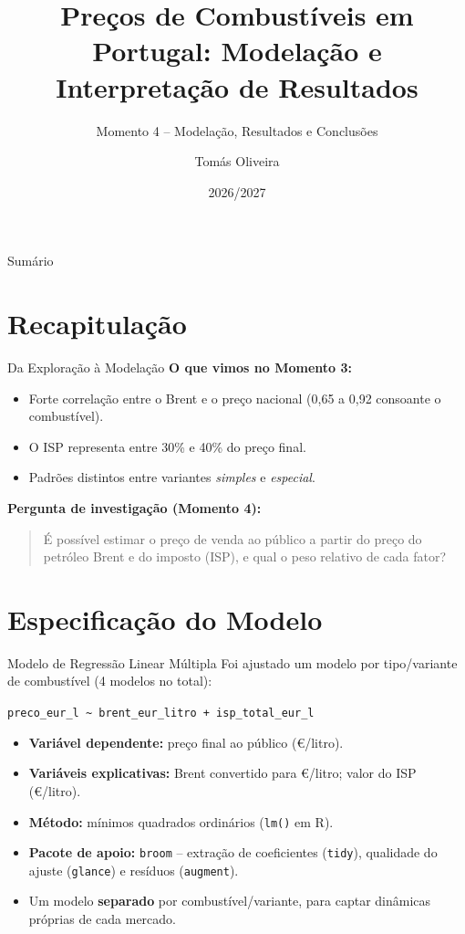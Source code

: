 \documentclass{beamer}
\title[Momento 4: Modelação e Resultados]{Preços de Combustíveis em Portugal: Modelação e Interpretação de Resultados}
\subtitle{Momento 4 -- Modelação, Resultados e Conclusões}
\author{Tomás Oliveira}
\institute[UFP]{Seminário de Sistemas e Aplicações \\ Mestrado em Engenharia Informática -- UFP}
\date{2026/2027}
\begin{document}
\begin{frame}
  \titlepage
\end{frame}

\begin{frame}{Sumário}
  \tableofcontents
\end{frame}

\section{Recapitulação}
\begin{frame}{Da Exploração à Modelação}
  \textbf{O que vimos no Momento 3:}
  \begin{itemize}
    \item Forte correlação entre o Brent e o preço nacional (0,65 a 0,92 consoante o combustível).
    \item O ISP representa entre 30\% e 40\% do preço final.
    \item Padrões distintos entre variantes \emph{simples} e \emph{especial}.
  \end{itemize}
  \vspace{0.4cm}
  \textbf{Pergunta de investigação (Momento 4):}
  \begin{quote}
    É possível estimar o preço de venda ao público a partir do preço do petróleo Brent e do imposto (ISP), e qual o peso relativo de cada fator?
  \end{quote}
\end{frame}

\section{Especificação do Modelo}
\begin{frame}{Modelo de Regressão Linear Múltipla}
  Foi ajustado um modelo por tipo/variante de combustível (4 modelos no total):
  \vspace{0.2cm}
  \begin{center}
    \texttt{preco\_eur\_l \textasciitilde\ brent\_eur\_litro + isp\_total\_eur\_l}
  \end{center}
  \vspace{0.3cm}
  \begin{itemize}
    \item \textbf{Variável dependente:} preço final ao público (€/litro).
    \item \textbf{Variáveis explicativas:} Brent convertido para €/litro; valor do ISP (€/litro).
    \item \textbf{Método:} mínimos quadrados ordinários (\texttt{lm()} em R).
    \item \textbf{Pacote de apoio:} \texttt{broom} -- extração de coeficientes (\texttt{tidy}), qualidade do ajuste (\texttt{glance}) e resíduos (\texttt{augment}).
    \item Um modelo \textbf{separado} por combustível/variante, para captar dinâmicas próprias de cada mercado.
  \end{itemize}
\end{frame}
\end{document}
